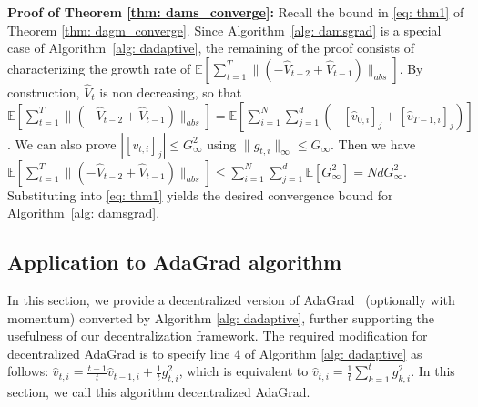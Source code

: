 \documentclass[11pt]{article}
\begin{document}
\textbf{Proof of Theorem \ref{thm: dams_converge}:} 
Recall the bound in \eqref{eq: thm1} of Theorem \ref{thm: dagm_converge}.
Since Algorithm~\ref{alg: damsgrad} is a special case of Algorithm~\ref{alg: dadaptive}, the remaining of the proof consists of characterizing the growth rate of $\mathbb E [ \sum_{t=1}^{T}   \|    (- \hat V_{t-2} + \hat V_{t-1} ) \|_{abs} ]$.
By construction, $\hat V_t$ is non decreasing, so that
$
\mathbb E [ \sum_{t=1}^{T}   \|    (- \hat V_{t-2} + \hat V_{t-1} ) \|_{abs} ] = \mathbb E [   \sum_{i=1}^N \sum_{j=1}^d    (- [\hat v_{0,i}]_j + [\hat v_{T-1,i}]_j ) ]
$.
We can also prove $|[v_{t,i}]_j| \leq G^2_{\infty}$ using $\|g_{t,i}\|_{\infty} \leq G_{\infty}$.
Then we have $\mathbb E \left[ \sum_{t=1}^{T}   \|    (- \hat V_{t-2} + \hat V_{t-1} ) \|_{abs} \right] \leq  \sum_{i=1}^N \sum_{j=1}^d  \mathbb E[G_{\infty}^2]=  Nd G_{\infty}^2$.
Substituting into \eqref{eq: thm1} yields the desired convergence bound for Algorithm~\ref{alg: damsgrad}.


\subsection{Application to AdaGrad algorithm}\label{sec:adagrad}

In this section, we provide a decentralized version of AdaGrad~\citep{duchi2011adaptive} (optionally with momentum) converted by Algorithm \ref{alg: dadaptive}, further supporting the usefulness of our decentralization framework. 
The required modification for decentralized AdaGrad is to specify line 4 of Algorithm \ref{alg: dadaptive} as follows: $ \hat v_{t,i} = \frac{t-1}{t} \hat v_{t-1,i} + \frac{1}{t} g_{t,i}^2 $, which is equivalent to  $\hat v_{t,i} = {\frac{1}{t}\sum_{k=1}^t g_{k,i}^2}$. 
In this section, we call this algorithm decentralized AdaGrad.
\end{document}
